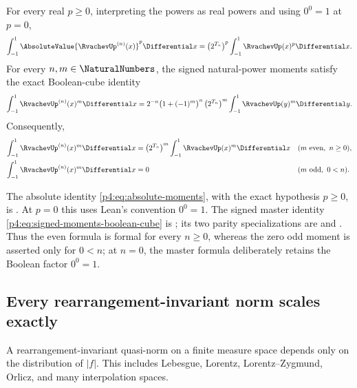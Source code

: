 \documentclass[11pt,oneside]{article}
\theoremstyle{definition}
\theoremstyle{remark}
\begin{document}
\begin{corollary}
\label{p4:cor:all-value-moments}
For every real $p\geq0$, interpreting the powers as real powers and using \(0^0=1\) at
\(p=0\),
\begin{equation}
 \int_{-1}^{1}\AbsoluteValue{\RvachevUp^{(n)}(x)}^p\Differential x
 =\left(2^{T_n}\right)^p\int_{-1}^{1}\RvachevUp(x)^p\Differential x.
 \label{p4:eq:absolute-moments}
\end{equation}
For every $n,m\in\NaturalNumbers$, the signed natural-power moments satisfy the exact
Boolean-cube identity
\begin{equation}
 \int_{-1}^{1}\RvachevUp^{(n)}(x)^m\Differential x
 =2^{-n}\bigl(1+(-1)^m\bigr)^n
   \left(2^{T_n}\right)^m
   \int_{-1}^{1}\RvachevUp(y)^m\Differential y.
 \label{p4:eq:signed-moments-boolean-cube}
\end{equation}
Consequently,
\begin{align}
 \int_{-1}^{1}\RvachevUp^{(n)}(x)^m\Differential x
 &=\left(2^{T_n}\right)^m
   \int_{-1}^{1}\RvachevUp(x)^m\Differential x
 &&(m\text{ even},\ n\geq0),\label{p4:eq:signed-moments-even}\\
 \int_{-1}^{1}\RvachevUp^{(n)}(x)^m\Differential x
 &=0
 &&(m\text{ odd},\ 0<n).
 \label{p4:eq:signed-moments}
\end{align}
\end{corollary}

The absolute identity \eqref{p4:eq:absolute-moments}, with the exact hypothesis \(p\ge0\), is
.  At \(p=0\) this uses Lean's
 convention \(0^0=1\).  The signed master identity
\eqref{p4:eq:signed-moments-boolean-cube} is
; its two parity specializations are
 and
.  Thus the even formula is
formal for every \(n\ge0\), whereas the zero odd moment is asserted only for \(0<n\); at
\(n=0\), the master formula deliberately retains the Boolean factor \(0^0=1\).

\subsection{Every rearrangement-invariant norm scales exactly}

A rearrangement-invariant quasi-norm on a finite measure space depends only on the
distribution of $|f|$.  This includes Lebesgue, Lorentz, Lorentz--Zygmund, Orlicz, and many
interpolation spaces.
\end{document}

